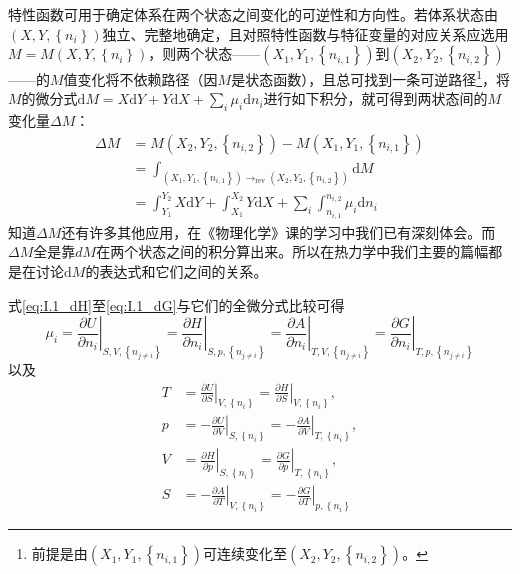 \documentclass[main.tex]{subfiles}
\begin{document}
特性函数可用于确定体系在两个状态之间变化的可逆性和方向性。若体系状态由$\left(X,Y,\left\{n_i\right\}\right)$独立、完整地确定，且对照特性函数与特征变量的对应关系应选用$M=M\left(X,Y,\left\{n_i\right\}\right)$，则两个状态——$\left(X_1,Y_1,\left\{n_{i,1}\right\}\right)$到$\left(X_2,Y_2,\left\{n_{i,2}\right\}\right)$——的$M$值变化将不依赖路径（因$M$是状态函数），且总可找到一条可逆路径\footnote{前提是由$\left(X_1,Y_1,\left\{n_{i,1}\right\}\right)$可连续变化至$\left(X_2,Y_2,\left\{n_{i,2}\right\}\right)$。}，将$M$的微分式$\mathrm{d}M=X\mathrm{d}Y+Y\mathrm{d}X+\sum_i\mu_i\mathrm{d}n_i$进行如下积分，就可得到两状态间的$M$变化量$\Delta M$：
\begin{equation}
    \begin{aligned}\label{eq:I.1_integral_of_function}
        \Delta M & =M\left(X_2,Y_2,\left\{n_{i,2}\right\}\right)-M\left(X_1,Y_1,\left\{n_{i,1}\right\}\right)                                      \\
                 & =\int_{\left(X_1,Y_1,\left\{n_{i,1}\right\}\right)\rightarrow_\text{rev}\left(X_2,Y_2,\left\{n_{i,2}\right\}\right)}\mathrm{d}M \\
                 & =\int_{Y_1}^{Y_2}X\mathrm{d}Y+\int_{X_1}^{X_2}Y\mathrm{d}X+\sum_i\int_{n_{i,1}}^{n_{i,2}}\mu_i\mathrm{d}n_i
    \end{aligned}
\end{equation}
知道$\Delta M$还有许多其他应用，在《物理化学》课的学习中我们已有深刻体会。而$\Delta M$全是靠$dM$在两个状态之间的积分算出来。所以在热力学中我们主要的篇幅都是在讨论$\mathrm{d}M$的表达式和它们之间的关系。

式\eqref{eq:I.1_dH}至\eqref{eq:I.1_dG}与它们的全微分式比较可得
\begin{equation}
    \mu_i=\left.\frac{\partial U}{\partial n_i}\right|_{S,V,\left\{n_{j\neq i}\right\}}
    =\left.\frac{\partial H}{\partial n_i}\right|_{S,p,\left\{n_{j\neq i}\right\}}
    =\left.\frac{\partial A}{\partial n_i}\right|_{T,V,\left\{n_{j\neq i}\right\}}
    =\left.\frac{\partial G}{\partial n_i}\right|_{T,p,\left\{n_{j\neq i}\right\}}\label{eq:I.1_first_order_partial_mu}
\end{equation}
以及
\begin{align}
    T & =\left.\frac{\partial U}{\partial S}\right|_{V,\left\{n_i\right\}}=\left.\frac{\partial H}{\partial S}\right|_{V,\left\{n_i\right\}},\label{eq:I.1_first_order_partial_T}   \\
    p & =-\left.\frac{\partial U}{\partial V}\right|_{S,\left\{n_i\right\}}=-\left.\frac{\partial A}{\partial V}\right|_{T,\left\{n_i\right\}},\label{eq:I.1_first_order_partial_p} \\
    V & =\left.\frac{\partial H}{\partial p}\right|_{S,\left\{n_i\right\}}=\left.\frac{\partial G}{\partial p}\right|_{T,\left\{n_i\right\}},\label{eq:I.1_first_order_partial_V}   \\
    S & =-\left.\frac{\partial A}{\partial T}\right|_{V,\left\{n_i\right\}}=-\left.\frac{\partial G}{\partial T}\right|_{p,\left\{n_i\right\}}\label{eq:I.1_first_order_partial_S}
\end{align}
\end{document}
